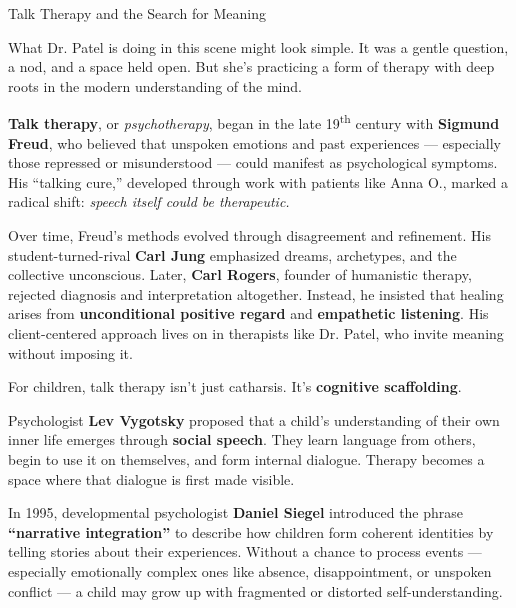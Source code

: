 \begin{PsychologicalSidebar}{Talk Therapy and the Search for Meaning}

    What Dr. Patel is doing in this scene might look simple. It was a gentle question, a nod, and 
    a space held open.  But she’s practicing a form of therapy with deep roots in the modern 
    understanding of the mind.
    
    \medskip
    
    \textbf{Talk therapy}, or \textit{psychotherapy}, began in the late 19\textsuperscript{th} century 
    with \textbf{Sigmund Freud}, who believed that unspoken emotions and past experiences --- especially 
    those repressed or misunderstood --- could manifest as psychological symptoms. His ``talking cure,'' 
    developed through work with patients like Anna O., marked a radical shift:  
    \textit{speech itself could be therapeutic.}
    
    \medskip
    
    Over time, Freud’s methods evolved through disagreement and refinement. His student-turned-rival 
    \textbf{Carl Jung} emphasized dreams, archetypes, and the collective unconscious. Later, \textbf{Carl 
    Rogers}, founder of humanistic therapy, rejected diagnosis and interpretation altogether. Instead, 
    he insisted
    that healing arises from \textbf{unconditional positive regard} and \textbf{empathetic 
    listening}. His client-centered approach lives on in therapists like Dr. Patel, who invite meaning 
    without imposing it.
    
    \medskip
    
    For children, talk therapy isn’t just catharsis. It’s \textbf{cognitive scaffolding}.
    
    Psychologist \textbf{Lev Vygotsky} proposed that a child’s understanding of their own inner life 
    emerges through \textbf{social speech}. They learn language from others, begin to use it 
    on themselves, and form internal dialogue. Therapy becomes a space where that dialogue is first 
    made visible.
    
    \medskip
    
    In 1995, developmental psychologist \textbf{Daniel Siegel} introduced the phrase \textbf{“narrative 
    integration”} to describe how children form coherent identities by telling stories about their 
    experiences. Without a chance to process events --- especially emotionally complex ones like absence, 
    disappointment, or unspoken conflict --- a child may grow up with fragmented or distorted 
    self-understanding.
    

\end{PsychologicalSidebar}
